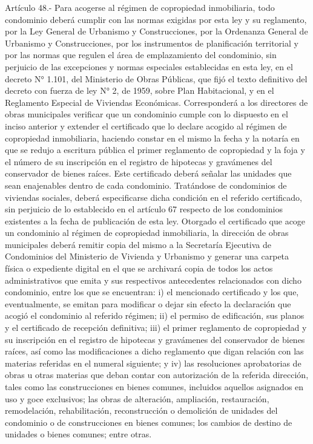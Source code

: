     Artículo 48.- Para acogerse al régimen de copropiedad inmobiliaria, todo condominio deberá cumplir con las normas exigidas por esta ley y su reglamento, por la Ley General de Urbanismo y Construcciones, por la Ordenanza General de Urbanismo y Construcciones, por los instrumentos de planificación territorial y por las normas que regulen el área de emplazamiento del condominio, sin perjuicio de las excepciones y normas especiales establecidas en esta ley, en el decreto N° 1.101, del Ministerio de Obras Públicas, que fijó el texto definitivo del decreto con fuerza de ley N° 2, de 1959, sobre Plan Habitacional, y en el Reglamento Especial de Viviendas Económicas.
    Corresponderá a los directores de obras municipales verificar que un condominio cumple con lo dispuesto en el inciso anterior y extender el certificado que lo declare acogido al régimen de copropiedad inmobiliaria, haciendo constar en el mismo la fecha y la notaría en que se redujo a escritura pública el primer reglamento de copropiedad y la foja y el número de su inscripción en el registro de hipotecas y gravámenes del conservador de bienes raíces. Este certificado deberá señalar las unidades que sean enajenables dentro de cada condominio. Tratándose de condominios de viviendas sociales, deberá especificarse dicha condición en el referido certificado, sin perjuicio de lo establecido en el artículo 67 respecto de los condominios existentes a la fecha de publicación de esta ley.
    Otorgado el certificado que acoge un condominio al régimen de copropiedad inmobiliaria, la dirección de obras municipales deberá remitir copia del mismo a la Secretaría Ejecutiva de Condominios del Ministerio de Vivienda y Urbanismo y generar una carpeta física o expediente digital en el que se archivará copia de todos los actos administrativos que emita y sus respectivos antecedentes relacionados con dicho condominio, entre los que se encuentran: i) el mencionado certificado y los que, eventualmente, se emitan para modificar o dejar sin efecto la declaración que acogió el condominio al referido régimen; ii) el permiso de edificación, sus planos y el certificado de recepción definitiva; iii) el primer reglamento de copropiedad y su inscripción en el registro de hipotecas y gravámenes del conservador de bienes raíces, así como las modificaciones a dicho reglamento que digan relación con las materias referidas en el numeral siguiente; y iv) las resoluciones aprobatorias de obras u otras materias que deban contar con autorización de la referida dirección, tales como las construcciones en bienes comunes, incluidos aquellos asignados en uso y goce exclusivos; las obras de alteración, ampliación, restauración, remodelación, rehabilitación, reconstrucción o demolición de unidades del condominio o de construcciones en bienes comunes; los cambios de destino de unidades o bienes comunes; entre otras.
